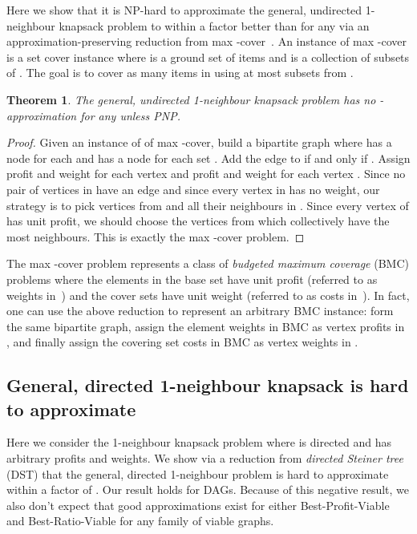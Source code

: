 \documentclass[12pt]{article}
\newtheorem{theorem}{Theorem}
\newcommand{\BMC}{{BMC}\xspace}
\newcommand{\DST}{{DST}\xspace}
\begin{document}
Here we show that it is NP-hard to approximate the general, undirected 1-neighbour knapsack problem to within a factor better than  for any  via an approximation-preserving reduction from max -cover~\cite{feige:jacm1998}.  An instance of max -cover is a set cover instance  where  is a ground set of  items and  is a collection of subsets of .  The goal is to cover
as many items in  using at most  subsets from .

\begin{theorem}
The general, undirected 1-neighbour knapsack problem has no -approximation for any  unless PNP.
\end{theorem}

\begin{proof}
Given an instance of  of max -cover, build a bipartite
graph  where  has a node  for each  and  has a node  for each set .  Add
the edge  to  if and only if .
Assign profit  and weight  for each vertex
 and profit  and weight  for each
vertex .  Since no pair of vertices in  have an edge
and since every vertex in  has no weight, our strategy is to pick
vertices from  and all their neighbours in .  Since every
vertex of  has unit profit, we should choose the  vertices from
 which collectively have the most neighbours.  This is exactly the
max -cover problem.

\end{proof}

The max -cover problem represents a class of {\em budgeted maximum
coverage} (\BMC) problems where the elements in the base set have
unit profit (referred to as weights in~\cite{kmn:ipl1999}) and the
cover sets have unit weight (referred to as costs
in~\cite{kmn:ipl1999}).  In fact, one can use the above reduction to
represent an arbitrary \BMC instance: form the same bipartite graph,
assign the element weights in \BMC as vertex profits in , and finally
assign the covering set costs in \BMC as vertex weights in .










\subsection{General, directed 1-neighbour knapsack is hard to approximate} \label{sec:gd1n}

Here we consider the 1-neighbour knapsack problem where  is directed and has arbitrary profits and weights.  We show via a reduction from {\em directed Steiner tree} (\DST) that the general, directed 1-neighbour problem is hard to approximate within a factor of .  Our result holds for DAGs.  Because of this negative result, we also don't expect that good approximations exist for either {\sc Best-Profit-Viable} and {\sc Best-Ratio-Viable} for any family of viable graphs.
\end{document}
